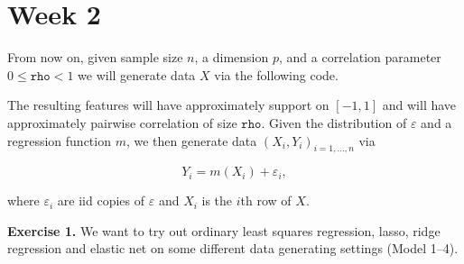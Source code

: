 \documentclass[
]{book}
\begin{document}
\hypertarget{week-2-1}{%
\section{Week 2}\label{week-2-1}}

From now on, given sample size \(n\), a dimension \(p\), and a correlation parameter \(0\le \texttt{rho}<1\) we will generate data \(X\) via the following code.

The resulting features will have approximately support on \([−1, 1]\) and will have approximately pairwise correlation of size \(\texttt{rho}\). Given the distribution of \(\varepsilon\) and a regression function \(m\), we then generate data \((X_i,Y_i)_{i=1,...,n}\) via

\[
Y_i=m(X_i)+\varepsilon_i,
\]

where \(\varepsilon_i\) are iid copies of \(\varepsilon\) and \(X_i\) is the \(i\)th row of \(X\).

\textbf{Exercise 1.} We want to try out ordinary least squares regression, lasso, ridge regression and elastic net on some different data generating settings (Model 1--4).
\end{document}
